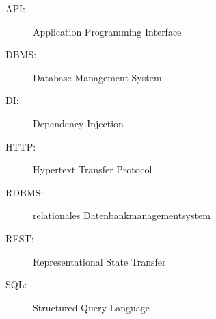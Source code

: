 \label{sec:abkuerzungsverzeichnis}

\begin{description}
  	\item[API:] Application Programming Interface
	\item[DBMS:] Database Management System
	\item[DI:] Dependency Injection
	\item[HTTP:] Hypertext Transfer Protocol
	\item[RDBMS:] relationales Datenbankmanagementsystem
	\item[REST:] Representational State Transfer
	\item[SQL:]Structured Query Language
\end{description}

